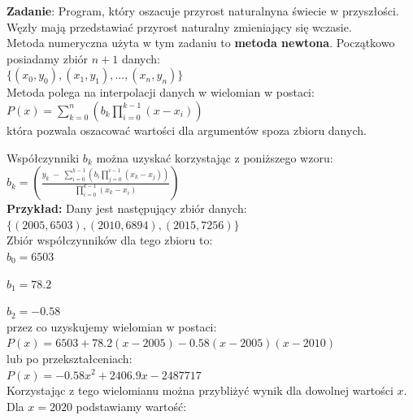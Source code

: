 \documentclass[a4paper,12pt]{article}
\newcommand{\id}{\noindent}
\newcommand{\bl}[1]{\textbf{#1}}
\begin{document}
\textbf{Zadanie}: Program, który oszacuje przyrost naturalnyna świecie w przyszłości. Węzły mają przedstawiać przyrost naturalny zmieniający się wczasie. \\

\id
Metoda numeryczna użyta w tym zadaniu to \textbf{metoda newtona}. Początkowo posiadamy zbiór $n+1$ danych: \\

$\{ (x_0, y_0), (x_1, y_1), ..., (x_n, y_n) \}$ \\

\id
Metoda polega na interpolacji danych w wielomian w postaci: \\

$P(x) = \sum\limits_{k=0}^{n}\left( b_k\prod\limits_{i=0}^{k-1}(x-x_i) \right )$ \\

\id
która pozwala oszacować wartości dla argumentów spoza zbioru danych. \\

\newpage

\id
Współczynniki $b_k$ można uzyskać korzystając z poniższego wzoru: \\

$b_k = \left( \frac{y_k \ - \ \sum\limits_{i=0}^{k-1}\left( b_i\prod\limits_{j=0}^{i-1}(x_k-x_j) \right)}{\prod\limits_{i = 0}^{k-1}(x_k - x_i)} \right)$ \\

\id
\bl{Przykład:} Dany jest następujący zbiór danych: \\

$\{ (2005, 6503), (2010, 6894), (2015, 7256) \}$ \\

\id
Zbiór współczynników dla tego zbioru to: \\

$b_0 = 6503$

$b_1 = 78.2$

$b_2 = -0.58$ \\

\id
przez co uzyskujemy wielomian w postaci: \\

$P(x) = 6503 + 78.2(x - 2005) - 0.58(x - 2005)(x - 2010)$ \\

\id
lub po przekształceniach: \\

$P(x) = -0.58x^2 + 2406.9 x - 2487717$ \\

\id
Korzystając z tego wielomianu można przybliżyć wynik dla dowolnej wartości $x$. Dla $x = 2020$ podstawiamy wartość: \\
\end{document}
